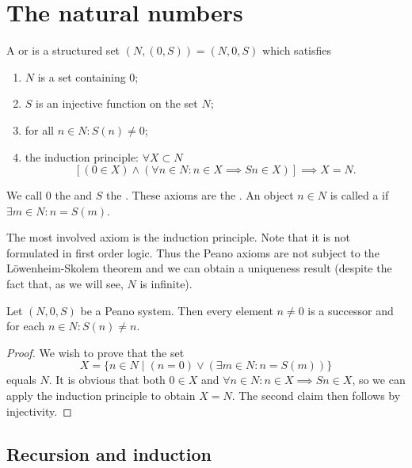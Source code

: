 \chapter{The natural numbers}
\begin{definition}
A  or  is a structured set $(N,(0,S)) = (N,0,S)$ which satisfies
\begin{enumerate}
\item $N$ is a set containing $0$;
\item $S$ is an injective function on the set $N$;
\item for all $n\in N: S(n) \neq 0$;
\item the induction principle: $\forall X\subset N$
\[ [(0\in X) \land (\forall n\in N: n\in X \implies Sn \in X)] \implies X = N. \]
\end{enumerate}
We call $0$ the  and $S$ the . These axioms are the . An object $n\in N$ is called a  if $\exists m\in N: n = S(m)$.
\end{definition}
The most involved axiom is the induction principle. Note that it is not formulated in first order logic. Thus the Peano axioms are not subject to the Löwenheim-Skolem theorem and we can obtain a uniqueness result (despite the fact that, as we will see, $N$ is infinite).

\begin{lemma} \label{successor}
Let $(N,0,S)$ be a Peano system. Then every element $n\neq 0$ is a successor and for each $n\in N: S(n) \neq n$.
\end{lemma}
\begin{proof}
We wish to prove that the set
\[ X = \{n\in N\;|\; (n=0)\lor(\exists m\in N: n = S(m))\} \]
equals $N$. It is obvious that both $0\in X$ and $\forall n\in N: n\in X \implies Sn \in X$, so we can apply the induction principle to obtain $X=N$. The second claim then follows by injectivity.
\end{proof}
\section{Recursion and induction}
